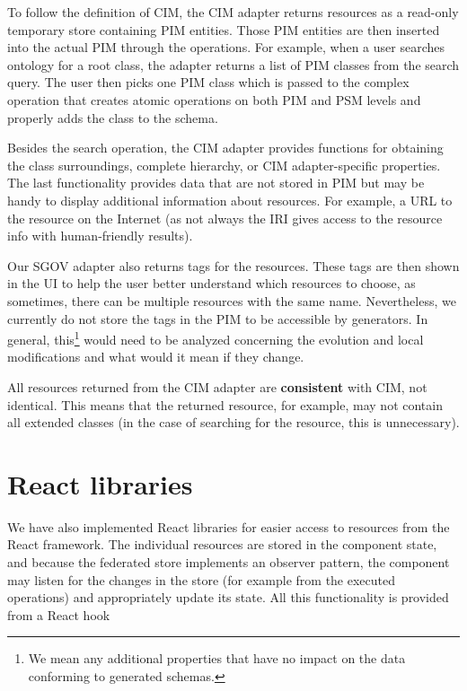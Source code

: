To follow the definition of CIM, the CIM adapter returns resources as a read-only temporary store containing PIM entities. Those PIM entities are then inserted into the actual PIM through the operations. For example, when a user searches ontology for a root class, the adapter returns a list of PIM classes from the search query. The user then picks one PIM class which is passed to the complex operation that creates atomic operations on both PIM and PSM levels and properly adds the class to the schema.

Besides the search operation, the CIM adapter provides functions for obtaining the class surroundings, complete hierarchy, or CIM adapter-specific properties. The last functionality provides data that are not stored in PIM but may be handy to display additional information about resources. For example, a URL to the resource on the Internet (as not always the IRI gives access to the resource info with human-friendly results).

Our SGOV adapter also returns tags for the resources. These tags are then shown in the UI to help the user better understand which resources to choose, as sometimes, there can be multiple resources with the same name. Nevertheless, we currently do not store the tags in the PIM to be accessible by generators. In general, this\footnote{We mean any additional properties that have no impact on the data conforming to generated schemas.} would need to be analyzed concerning the evolution and local modifications and what would it mean if they change.

\medskip

All resources returned from the CIM adapter are \textbf{consistent} with CIM, not identical. This means that the returned resource, for example, may not contain all extended classes (in the case of searching for the resource, this is unnecessary).

\section{React libraries}

We have also implemented React libraries for easier access to resources from the React framework. The individual resources are stored in the component state, and because the federated store implements an observer pattern, the component may listen for the changes in the store (for example from the executed operations) and appropriately update its state. All this functionality is provided from a React hook

